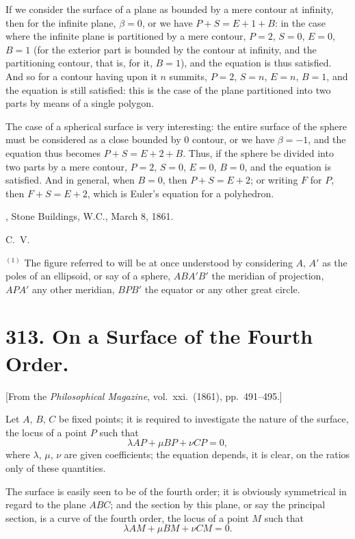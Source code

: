 \documentclass[11pt,a4paper]{article}
\theoremstyle{plain}
\begin{document}
\newpage
If we consider the surface of a plane as bounded by a mere contour at infinity, then for the infinite plane, $\beta = 0$, or we have $P + S = E + 1 + B$: in the case where the infinite plane is partitioned by a mere contour, $P = 2$, $S = 0$, $E = 0$, $B = 1$ (for the exterior part is bounded by the contour at infinity, and the partitioning contour, that is, for it, $B = 1$), and the equation is thus satisfied. And so for a contour having upon it $n$ summits, $P = 2$, $S = n$, $E = n$, $B = 1$, and the equation is still satisfied: this is the case of the plane partitioned into two parts by means of a single polygon.

The case of a spherical surface is very interesting: the entire surface of the sphere must be considered as a close bounded by 0 contour, or we have $\beta = -1$, and the equation thus becomes $P + S = E + 2 + B$. Thus, if the sphere be divided into two parts by a mere contour, $P = 2$, $S = 0$, $E = 0$, $B = 0$, and the equation is satisfied. And in general, when $B = 0$, then $P + S = E + 2$; or writing $F$ for $P$, then $F + S = E + 2$, which is Euler's equation for a polyhedron.

\medskip
{}, Stone Buildings, W.C., March 8, 1861.

\medskip
\noindent C.\ V.

\medskip
\noindent $^{(1)}$ The figure referred to will be at once understood by considering $A$, $A'$ as the poles of an ellipsoid, or say of a sphere, $ABA'B'$ the meridian of projection, $APA'$ any other meridian, $BPB'$ the equator or any other great circle.


\newpage
\section*{313. On a Surface of the Fourth Order.}

[From the \textit{Philosophical Magazine}, vol.\ xxi.\ (1861), pp.\ 491--495.]

\medskip

Let $A$, $B$, $C$ be fixed points; it is required to investigate the nature of the surface, the locus of a point $P$ such that
\[
\lambda AP + \mu BP + \nu CP = 0,
\]
where $\lambda$, $\mu$, $\nu$ are given coefficients; the equation depends, it is clear, on the ratios only of these quantities.

The surface is easily seen to be of the fourth order; it is obviously symmetrical in regard to the plane $ABC$; and the section by this plane, or say the principal section, is a curve of the fourth order, the locus of a point $M$ such that
\[
\lambda AM + \mu BM + \nu CM = 0.
\]
\end{document}
